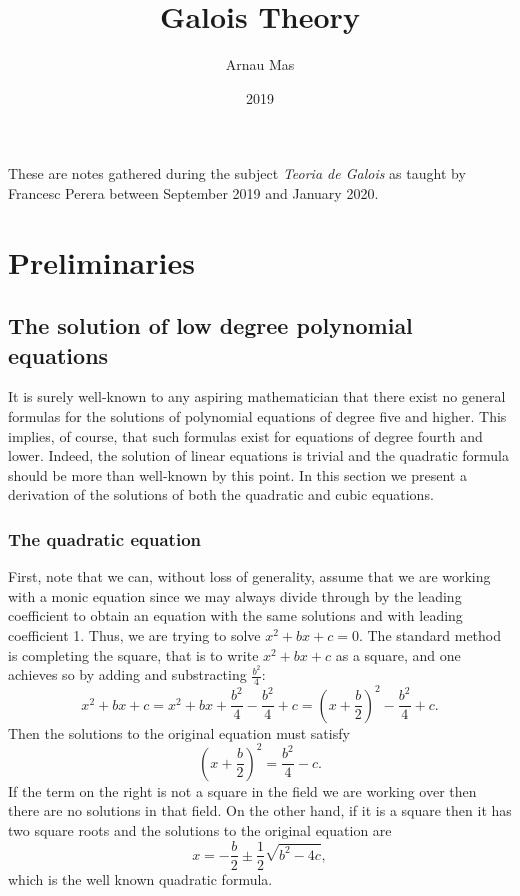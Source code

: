 \documentclass[12pt,oneside]{book}
\title{Galois Theory}
\author{Arnau Mas}
\date{2019}
\numberwithin{table}{section}
\numberwithin{equation}{section}
\numberwithin{figure}{section}
\begin{document}
\maketitle

\frontmatter
\pagestyle{plain}
These are notes gathered during the subject \emph{Teoria de Galois} as taught by Francesc Perera between September 2019 and January 2020.

\mainmatter

\chapter{Preliminaries}
\section{The solution of low degree polynomial equations}
It is surely well-known to any aspiring mathematician that there exist no general formulas for the solutions of polynomial equations of degree five and higher. This implies, of course, that such formulas exist for equations of degree fourth and lower. Indeed, the solution of linear equations is trivial and the quadratic formula should be more than well-known by this point. In this section we present a derivation of the solutions of both the quadratic and cubic equations. 

\subsection{The quadratic equation}
First, note that we can, without loss of generality, assume that we are working with a monic equation since we may always divide through by the leading coefficient to obtain an equation with the same solutions and with leading coefficient 1. Thus, we are trying to solve \( x^2 + bx + c = 0 \). The standard method is completing the square, that is to write \( x^2 + bx + c \) as a square, and one achieves so by adding and substracting \( \frac{b^2}{4} \):
\begin{equation*}
	x^2 + bx + c = x^2 + bx + \frac{b^2}{4} - \frac{b^2}{4} + c = \left(x + \frac{b}{2}\right)^2 - \frac{b^2}{4} + c.
\end{equation*}
Then the solutions to the original equation must satisfy
\begin{equation*}
	\left(x + \frac{b}{2}\right)^2 = \frac{b^2}{4} - c.
\end{equation*}
If the term on the right is not a square in the field we are working over then there are no solutions in that field. On the other hand, if it is a square then it has two square roots and the solutions to the original equation are
\begin{equation*}
	x = - \frac{b}{2} \pm \frac{1}{2}\sqrt{b^2 - 4c},
\end{equation*}
which is the well known quadratic formula.
\end{document}
